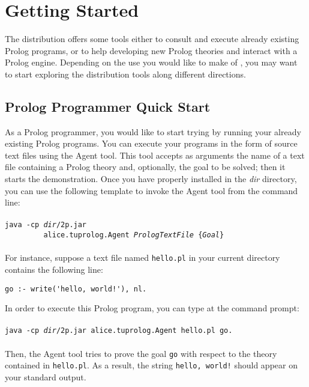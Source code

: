 \chapter{Getting Started}
\label{getting-started}

The \tuprolog{} distribution offers some tools either to consult and execute already existing Prolog programs, or to help developing new Prolog theories and interact with a Prolog engine. %
Depending on the use you would like to make of \tuprolog{}, you may want to start exploring the distribution tools along different directions.

\section{Prolog Programmer Quick Start}

As a Prolog programmer, you would like to start trying \tuprolog{} by running your
already existing Prolog programs. You can execute your programs in the form of source
text files using the \tuprolog{} Agent tool. This tool accepts as arguments the name of
a text file containing a Prolog theory and, optionally, the goal to be solved; then it starts
the demonstration. Once you have properly installed \tuprolog{} in the \emph{dir}
directory, you can use the following template to invoke the Agent tool from the
command line:\\\\
%
\texttt{java -cp \emph{dir}/2p.jar\\
\mbox{~~~~~~~~~}alice.tuprolog.Agent \textit{PrologTextFile}
\{\textit{Goal}\}\\\\}
%
For instance, suppose a text file named \verb|hello.pl| in your current directory contains the following line:
\begin{verbatim}
go :- write('hello, world!'), nl.
\end{verbatim}
In order to execute this Prolog program, you can type at the command prompt:\\\\
%
\texttt{java -cp \emph{dir}/2p.jar alice.tuprolog.Agent hello.pl go.\\\\}
%
Then, the Agent tool tries to prove the goal \texttt{go} with respect to the theory contained in \texttt{hello.pl}. 
%
As a result, the string \texttt{hello, world!} should appear on your standard output.

